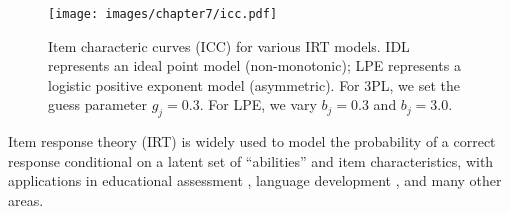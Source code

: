 \begin{figure}
    \centering
    \texttt{[image: images/chapter7/icc.pdf]}
    \caption{Item characteric curves (ICC) for various IRT models. IDL represents an ideal point model (non-monotonic); LPE represents a logistic positive exponent model (asymmetric). For 3PL, we set the guess parameter $g_j = 0.3$. For LPE, we vary $b_j = 0.3$ and $b_j = 3.0$.}
    \label{fig:icc}
\end{figure}


Item response theory (IRT) is widely used to model the probability of a correct response conditional on a latent set of ``abilities'' and item characteristics, with applications in educational assessment \cite{edgeworth1888statistics,ravitch1995national,harlen2001assessment}, language development \cite{braginsky2015developmental,luniewska2016ratings,frank2017wordbank,hartshorne2018critical}, and many other areas.

